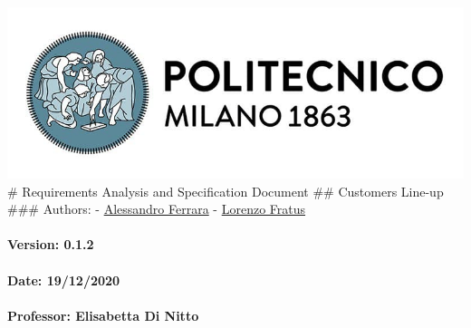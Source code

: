 \documentclass[
]{article}
\author{}
\date{}
\begin{document}
\includegraphics{assets/use/../polimi_logo.jpg} \# Requirements Analysis
and Specification Document \#\# Customers Line-up \#\#\# Authors: -
\href{https://github.com/ferrohd}{Alessandro Ferrara} -
\href{https://github.com/lorenzofratus}{Lorenzo Fratus}

\hypertarget{version-0.1.2}{%
\paragraph{\texorpdfstring{Version: 0.1.2
}{Version: 0.1.2 }}\label{version-0.1.2}}

\hypertarget{date-19122020}{%
\paragraph{\texorpdfstring{Date: 19/12/2020
}{Date: 19/12/2020 }}\label{date-19122020}}

\hypertarget{professor-elisabetta-di-nitto}{%
\paragraph{\texorpdfstring{Professor: Elisabetta Di Nitto
}{Professor: Elisabetta Di Nitto }}\label{professor-elisabetta-di-nitto}}
\end{document}

